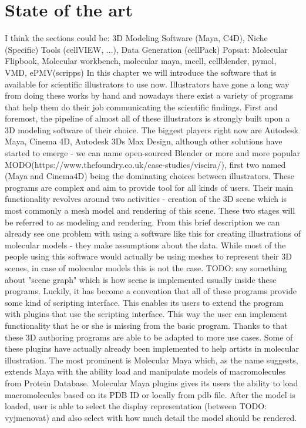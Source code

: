 \documentclass[
  digital, %
  table,   %
  lof,     %
  lot,     %
]{fithesis3}
\begin{document}
\chapter{State of the art}
I think the sections could be: 3D Modeling Software (Maya, C4D), Niche (Specific) Tools (cellVIEW, ...), Data Generation (cellPack)
Popsat: Molecular Flipbook, Molecular workbench, molecular maya, mcell, cellblender, pymol, VMD, ePMV(scripps)
In this chapter we will introduce the software that is available for scientific illustrators to use now. Illustrators have gone a long way from doing these works by hand and nowadays there exist a variety of programs that help them do their job communicating the scientific findings.
First and foremost, the pipeline of almost all of these illustrators is strongly built upon a 3D modeling software of their choice. The biggest players right now are Autodesk Maya, Cinema 4D, Autodesk 3Ds Max Design, although other solutions have started to emerge - we can name open-sourced Blender or more and more popular MODO(https://www.thefoundry.co.uk/case-studies/viscira/), first two named (Maya and Cinema4D) being the dominating choices between illustrators. These programs are complex and aim to provide tool for all kinds of users. Their main functionality revolves around two activities - creation of the 3D scene which is most commonly a mesh model and rendering of this scene. These two stages will be referred to as modeling and rendering. From this brief description we can already see one problem with using a software like this for creating illustrations of molecular models - they make assumptions about the data. While most of the people using this software would actually be using meshes to represent their 3D scenes, in case of molecular models this is not the case. TODO: say something about "scene graph" which is how scene is implemented usually inside these programs.
Luckily, it has become a convention that all of these programs provide some kind of scripting interface. This enables its users to extend the program with plugins that use the scripting interface. This way the user can implement functionality that he or she is missing from the basic program. Thanks to that these 3D authoring programs are able to be adapted to more use cases. 
Some of these plugins have actually already been implemented to help artists in molecular illustration. The most prominent is Molecular Maya which, as the name suggests, extends Maya with the ability load and manipulate models of macromolecules from Protein Database. Molecular Maya plugins gives its users the ability to load macromolecules based on its PDB ID or locally from pdb file. After the model is loaded, user is able to select the display representation (between TODO: vyjmenovat) and also select with how much detail the model should be rendered.
\end{document}
